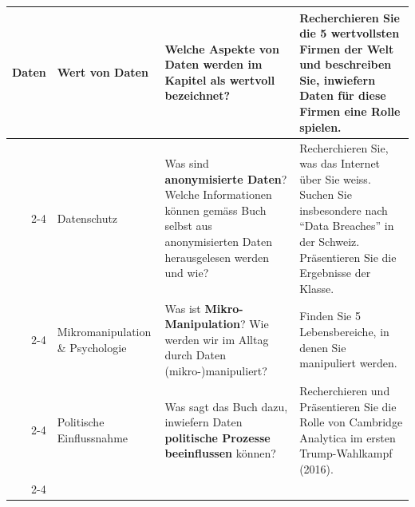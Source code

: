 \begin{landscape}
\begin{longtable}{@{}rp{5.3cm}p{9.5cm}p{9.5cm}@{}}
		\multirow{5}{*}{\textbf{Daten}}        & Wert von Daten                        & Welche Aspekte von Daten werden im Kapitel als \textbf{wertvoll} bezeichnet?                                                                                                                                                                                                                                                                                                         & Recherchieren Sie die 5 wertvollsten Firmen der Welt und beschreiben Sie, inwiefern Daten für diese Firmen eine Rolle spielen.                                                                                                                                                   \\\cmidrule(l){2-4}
		                              & Datenschutz                           & Was sind \textbf{anonymisierte Daten}? Welche Informationen können gemäss Buch selbst aus anonymisierten Daten herausgelesen werden und wie?                                                                                                                                                                                                                                                 & Recherchieren Sie, was das Internet über Sie weiss. Suchen Sie insbesondere nach \enquote{Data Breaches} in der Schweiz. Präsentieren Sie die Ergebnisse der Klasse.                                                                                                                   \\\cmidrule(l){2-4}
		                              & Mikromanipulation \& Psychologie      & Was ist \textbf{Mikro-Manipulation}? Wie werden wir im Alltag durch Daten (mikro-)manipuliert?                                                                                                                                                                                                                                                                                       & Finden Sie 5 Lebensbereiche, in denen Sie manipuliert werden.                                                                                                                                                                                                                    \\\cmidrule(l){2-4}
		                              & Politische Einflussnahme              & Was sagt das Buch dazu, inwiefern Daten \textbf{politische Prozesse beeinflussen} können?                                                                                                                                                                                                                                                                                            & Recherchieren und Präsentieren Sie die Rolle von Cambridge Analytica im ersten Trump-Wahlkampf (2016).                                                                                                                                                                           \\\cmidrule(l){2-4}

\end{longtable}
\end{landscape}
